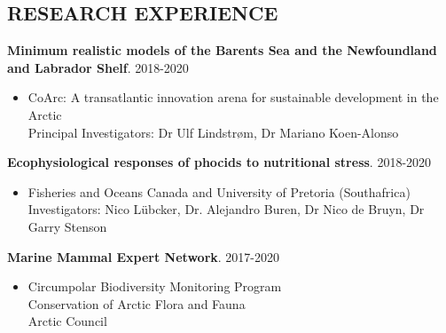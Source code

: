 \documentclass{res}
\begin{document}
\begin{resume}
\section{RESEARCH EXPERIENCE}
\vspace{0.1in}

{\bf Minimum realistic models of the Barents Sea and the Newfoundland and Labrador Shelf}. 2018-2020
\begin{itemize} %
	\item[] CoArc: A transatlantic innovation arena for sustainable development in the Arctic\\
	Principal Investigators: Dr Ulf Lindstr{\o}m, Dr Mariano Koen-Alonso
\end{itemize}

{\bf Ecophysiological responses of phocids to nutritional stress}. 2018-2020
\begin{itemize} %
	\item[] Fisheries and Oceans Canada and University of Pretoria (Southafrica)\\
	Investigators: Nico L\"ubcker, Dr. Alejandro Buren, Dr Nico de Bruyn, Dr Garry Stenson
\end{itemize}

{\bf Marine Mammal Expert Network}. 2017-2020
\begin{itemize} %
	\item[] Circumpolar Biodiversity Monitoring Program\\
	Conservation of Arctic Flora and Fauna\\
	Arctic Council
\end{itemize}


\end{resume}
\end{document}
